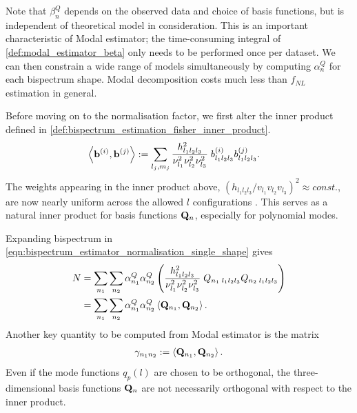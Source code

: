 Note that $\beta_n^Q$ depends on the observed data and choice of basis functions, but is independent of theoretical model in consideration. This is an important characteristic of Modal estimator; the time-consuming integral of \eqref{def:modal_estimator_beta} only needs to be performed once per dataset. We can then constrain a wide range of models simultaneously by computing $\alpha^Q_n$ for each bispectrum shape. Modal decomposition costs much less than $f_{NL}$ estimation in general.

Before moving on to the normalisation factor, we first alter the inner product defined in \eqref{def:bispectrum_estimation_fisher_inner_product}.
\begin{align}
	\left< \mathbf{b}^{(i)}, \mathbf{b}^{(j)} \right> &:= \sum_{l_j,m_j} \frac{h^2_{l_1 l_2 l_3}}{\nu_{l_1}^2 \nu_{l_2}^2 \nu_{l_3}^2 } \; b^{(i)}_{l_1 l_2 l_3} b^{(j)}_{l_1 l_2 l_3}.
\end{align}
The weights appearing in the inner product above, $(h_{l_1 l_2 l_3}/v_{l_1} v_{l_2} v_{l_3})^2\approx const.$, are now nearly uniform across the allowed $l$ configurations \cite{Fergusson2010general}. This serves as a natural inner product for basis functions $\mathbf{Q}_n$, especially for polynomial modes.

Expanding bispectrum in \eqref{eqn:bispectrum_estimator_normalisation_single_shape} gives
\begin{align}
	N &= \sum_{n_1} \sum_{n_2} \alpha^Q_{n_1} \alpha^Q_{n_2} \left( \frac{h^2_{l_1 l_2 l_3}}{\nu_{l_1}^2 \nu_{l_2}^2 \nu_{l_3}^2 } \; Q_{n_1 \; l_1 l_2 l_3} Q_{n_2 \; l_1 l_2 l_3} \right) \\
	&= \sum_{n_1} \sum_{n_2} \alpha^Q_{n_1} \alpha^Q_{n_2} \left< \mathbf{Q}_{n_1}, \mathbf{Q}_{n_2} \right>. \label{eqn:modal_estimator_normalisation_Q}
\end{align}
Another key quantity to be computed from Modal estimator is the matrix
\begin{align}
	\gamma_{n_1 n_2} :=  \left< \mathbf{Q}_{n_1} , \mathbf{Q}_{n_2} \right>.
\end{align}
Even if the mode functions $q_p(l)$ are chosen to be orthogonal, the three-dimensional basis functions $\mathbf{Q}_n$ are not necessarily orthogonal with respect to the inner product.


